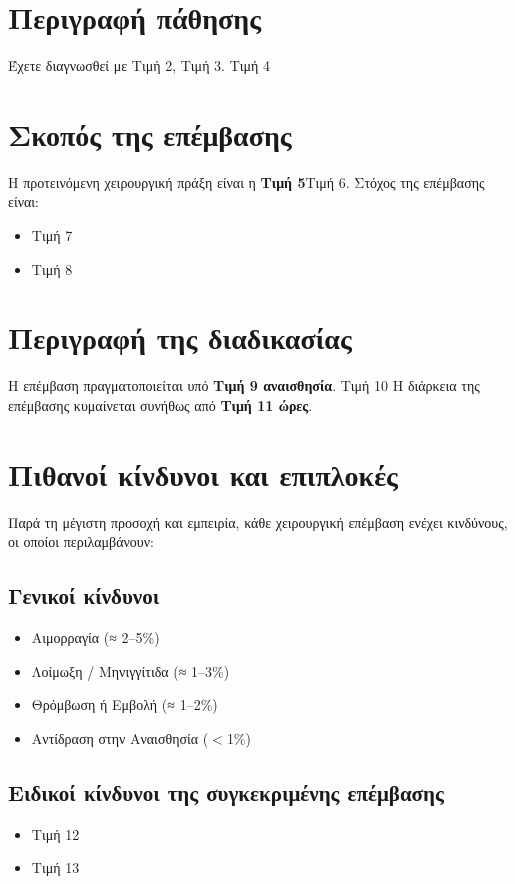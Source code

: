 \documentclass[10pt,greek]{article}
\begin{document}
\begin{PatientInfo}
\end{PatientInfo}

\section{Περιγραφή πάθησης}
Έχετε διαγνωσθεί με Τιμή 2, Τιμή 3.
Τιμή 4

\section{Σκοπός της επέμβασης}
Η προτεινόμενη χειρουργική πράξη είναι η \textbf{Τιμή 5}Τιμή 6.
Στόχος της επέμβασης είναι:
\begin{itemize}
\item Τιμή 7
\item Τιμή 8
\end{itemize}

\section{Περιγραφή της διαδικασίας}
Η επέμβαση πραγματοποιείται υπό \textbf{Τιμή 9 αναισθησία}.
Τιμή 10
Η διάρκεια της επέμβασης κυμαίνεται συνήθως από \textbf{Τιμή 11 ώρες}.

\section{Πιθανοί κίνδυνοι και επιπλοκές}
Παρά τη μέγιστη προσοχή και εμπειρία, κάθε χειρουργική επέμβαση ενέχει κινδύνους, οι οποίοι περιλαμβάνουν:
\subsection*{Γενικοί κίνδυνοι}
\begin{itemize}
\item Αιμορραγία (≈ 2--5\%)
\item Λοίμωξη / Μηνιγγίτιδα (≈ 1--3\%)
\item Θρόμβωση ή Εμβολή (≈ 1--2\%)
\item Αντίδραση στην Αναισθησία ($<$1\%)
\end{itemize}
\subsection*{Ειδικοί κίνδυνοι της συγκεκριμένης επέμβασης}
\begin{itemize}
\item Τιμή 12
\item Τιμή 13
\end{itemize}
\end{document}
